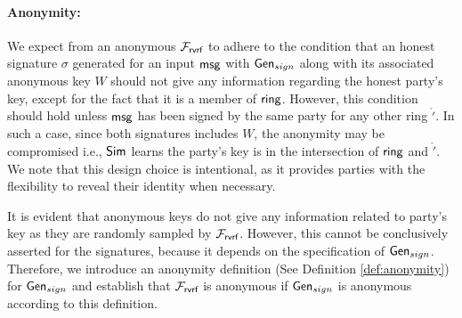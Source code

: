 	
	\paragraph{Anonymity:} We expect from an anonymous $ \mathcal{F}_{\textsf{rvrf}} $  to adhere to the condition that an honest signature $\sigma$ generated for an input $\mathsf{msg}$ with $ \mathsf{Gen}_{sign} $ along with its associated anonymous key $W$ should not give any information regarding the honest party's key, except for the fact that it is a member of $ \mathsf{ring} $.  However, this condition should hold unless $\mathsf{msg}$ has been signed by the same party for any other ring $\ring'$. In such a case,  since both signatures includes $ W $, the anonymity may be compromised  i.e.,  $ \mathsf{Sim} $  learns the party's key is in the intersection of $ \mathsf{ring} $ and $ \ring' $. We note that this design choice is intentional, as it provides parties with the flexibility to reveal their identity when necessary.
		
	It is evident that anonymous keys do not give any information related to party's key as they are randomly sampled by $ \mathcal{F}_{\textsf{rvrf}} $. However, this cannot be conclusively asserted for the signatures, because it depends on the specification of $ \mathsf{Gen}_{sign} $. Therefore, we introduce an anonymity definition (See Definition \ref{def:anonymity}) for $ \mathsf{Gen}_{sign} $ and establish that $ \mathcal{F}_{\textsf{rvrf}} $ is anonymous if $ \mathsf{Gen}_{sign} $ is anonymous according to this definition.
	

